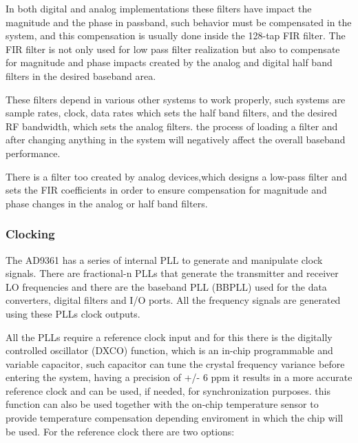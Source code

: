In both digital and analog implementations these filters have impact the
magnitude and the phase in passband, such behavior must be compensated in the
system, and this compensation is usually done inside the 128-tap FIR filter. The
FIR filter is not only used for low pass filter realization but also to
compensate for magnitude and phase impacts created by the analog and digital
half band filters in the desired baseband area.

These filters depend in various other systems to work properly, such systems are
sample rates, clock, data rates which sets the half band filters, and the
desired RF bandwidth, which sets the analog filters. the process of loading a
filter and after changing anything in the system will negatively affect the
overall baseband performance.

There is a filter too created by analog devices,which designs a low-pass filter
and sets the FIR coefficients in order to ensure compensation for magnitude and
phase changes in the analog or half band filters.
\subsubsection{Clocking}

The AD9361 has a series of internal PLL to generate and manipulate clock
signals. There are fractional-n PLLs that generate the transmitter and receiver
LO frequencies and there are the baseband PLL (BBPLL) used for the data
converters, digital filters and I/O ports. All the frequency signals are
generated using these PLLs clock outputs.

All the PLLs require a reference clock input and for this there is the digitally
controlled oscillator (DXCO) function, which is an in-chip programmable and
variable capacitor, such capacitor can tune the crystal frequency variance
before entering the system, having a precision of +/- 6 ppm it results in a more
accurate reference clock and can be used, if needed, for synchronization
purposes. this function can also be used together with the on-chip temperature
sensor to provide temperature compensation depending enviroment in which the
chip will be used. For the reference clock there are two options:

